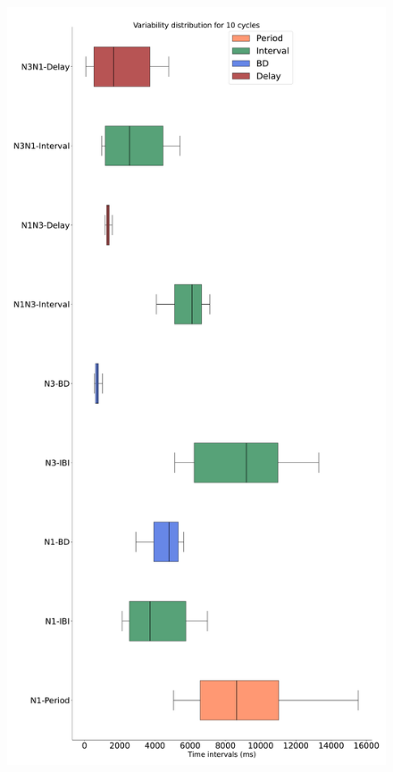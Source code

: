 \begin{figure}[htbp]
\begin{minipage}[b]{0.45\textwidth}
		\includegraphics[width=\textwidth]{./invariants/data/SUSSEX/prep4_so_no_driven/images/prep4_so_no_driven_boxplot.pdf}
	\end{minipage}
	\begin{minipage}[b]{0.53\textwidth}

\end{minipage}
\end{figure}
